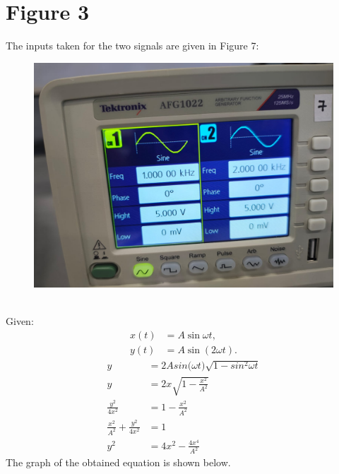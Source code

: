 \documentclass[a4paper,12pt]{article}
\numberwithin{equation}{section} %
\begin{document}
\section{Figure 3}
The inputs taken for the two signals are given in Figure 7:
\begin{figure}[h!]
    \centering
    \includegraphics[width=0.5\linewidth]{Tables/Table5.jpeg} 
    \caption{}
\end{figure}\\
\noindent Given:
\begin{align}
    x(t) &= A \sin \omega t, \\
    y(t) &= A \sin(2\omega t).
\end{align}
\begin{align}
    y&=2A{sin(\omega t})\sqrt{1-sin^2{\omega t}}\\
    y&=2x\sqrt{1-\frac{x^2}{A^2}}\\
    \frac{y^2}{4x^2}&=1-\frac{x^2}{A^2}\\
    \frac{x^2}{A^2}+\frac{y^2}{4x^2}&=1\\
    y^2&=4x^2-\frac{4x^4}{A^2}
\end{align}
The graph of the obtained equation is shown below.
\end{document}
